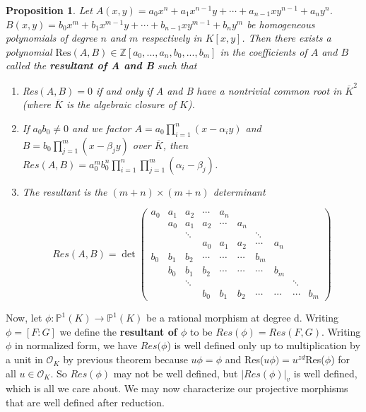 \documentclass{amsart}
\newtheorem{prop}[thm]{Proposition}
\newcommand{\MCO}{\mathcal{O}}
\newcommand{\ol}{\overline}
\begin{document}
\begin{prop}
 Let $A(x,y)=a_0x^n+a_1x^{n-1}y+\cdots + a_{n-1}xy^{n-1}+a_ny^n$. 
 $B(x,y)=b_0x^m+b_1x^{m-1}y+\cdots +b_{n-1}xy^{m-1}+b_ny^m$ be homogeneous polynomials of degree $n$ and $m$ respectively in $K[x,y]$. Then there exists a polynomial $\text{Res}(A,B) \in \mathbb{Z}[a_0,...,a_n,b_0,...,b_m]$ in the coefficients of $A$ and $B$ called the \textbf{resultant of A and B} such that 
\begin{enumerate}
\item Res$(A,B)=0$ if and only if A and B have a nontrivial common root in $\overline{K}^2$ (where $\ol{K}$ is the algebraic closure of $K$). 
\item If $a_0b_0 \neq 0$ and we factor $A=a_0 \prod_{i=1}^n(x-\alpha_iy)$ and $B=b_0\prod_{j=1}^m (x - \beta_jy)$ over $\ol{K}$, then $Res(A,B) = a_0^{m}b_0^{n}\prod_{i=1}^n\prod_{j=1}^m(\alpha_i - \beta_j)$. 
 
\item The resultant is the $(m+n) \times (m+n)$ determinant
 
 \[
Res(A,B) = \det \begin{pmatrix}
a_0 & a_1 & a_2 & \cdots & a_n & & & \\
    & a_0 & a_1 & a_2 & \cdots & a_n\\
    &     & \ddots &    &      &  & \ddots\\      
    &   &  & a_0 & a_1 & a_2 & \cdots & a_n\\
b_0 & b_1 & b_2 & \cdots &\cdots & \cdots & b_m\\
    & b_0 & b_1 & b_2 & \cdots &\cdots & \cdots & b_m\\
    &&\ddots &&&&&& \ddots\\
    &&&b_0 & b_1 & b_2 & \cdots &\cdots & \cdots & b_m 
\end{pmatrix}
\]

 \end{enumerate} 
 \end{prop}




 
 Now, let $\phi : \mathbb{P}^1(K) \rightarrow \mathbb{P}^1(K)$ be a rational morphism at degree d. Writing $\phi =[F:G]$ we define the \textbf{resultant of $\phi$} to be $Res(\phi)=Res(F,G)$. Writing $\phi$ in normalized form, we have $Res(\phi$) is well defined only up to multiplication by a unit in $\MCO_K$ by previous theorem because $u\phi=\phi$ and Res($u\phi)=u^{zd}$Res($\phi$) for all $u \in \MCO_K$. So $Res(\phi)$ may not be well defined, but $|Res(\phi)|_v$ is well defined, which is all we care about. We may now characterize our projective morphisms that are well defined after reduction. 
 
\end{document}
